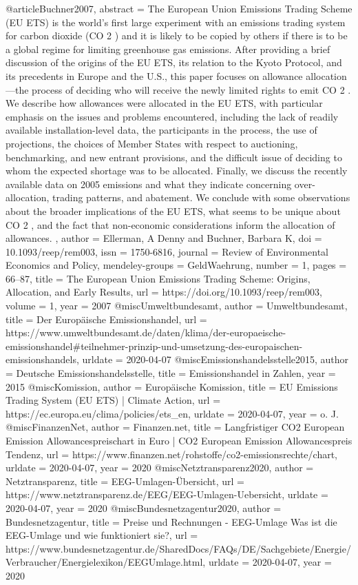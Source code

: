 @article{Buchner2007,
abstract = {The European Union Emissions Trading Scheme (EU ETS) is the world's first large experiment with an emissions trading system for carbon dioxide (CO 2 ) and it is likely to be copied by others if there is to be a global regime for limiting greenhouse gas emissions. After providing a brief discussion of the origins of the EU ETS, its relation to the Kyoto Protocol, and its precedents in Europe and the U.S., this paper focuses on allowance allocation—the process of deciding who will receive the newly limited rights to emit CO 2 . We describe how allowances were allocated in the EU ETS, with particular emphasis on the issues and problems encountered, including the lack of readily available installation-level data, the participants in the process, the use of projections, the choices of Member States with respect to auctioning, benchmarking, and new entrant provisions, and the difficult issue of deciding to whom the expected shortage was to be allocated. Finally, we discuss the recently available data on 2005 emissions and what they indicate concerning over-allocation, trading patterns, and abatement. We conclude with some observations about the broader implications of the EU ETS, what seems to be unique about CO 2 , and the fact that non-economic considerations inform the allocation of allowances. },
author = {Ellerman, A Denny and Buchner, Barbara K},
doi = {10.1093/reep/rem003},
issn = {1750-6816},
journal = {Review of Environmental Economics and Policy},
mendeley-groups = {GeldWaehrung},
number = {1},
pages = {66--87},
title = {{The European Union Emissions Trading Scheme: Origins, Allocation, and Early Results}},
url = {https://doi.org/10.1093/reep/rem003},
volume = {1},
year = {2007}
}
@misc{Umweltbundesamt,
author = {Umweltbundesamt},
title = {{Der Europ{\"{a}}ische Emissionshandel}},
url = {https://www.umweltbundesamt.de/daten/klima/der-europaeische-emissionshandel{\#}teilnehmer-prinzip-und-umsetzung-des-europaischen-emissionshandels},
urldate = {2020-04-07}
}
@misc{Emissionshandelsstelle2015,
author = {{Deutsche Emissionshandelsstelle}},
title = {{Emissionshandel in Zahlen}},
year = {2015}
}
@misc{Komission,
author = {{Europ{\"{a}}ische Komission}},
title = {{EU Emissions Trading System (EU ETS) | Climate Action}},
url = {https://ec.europa.eu/clima/policies/ets{\_}en},
urldate = {2020-04-07},
year = {{o. J.}}
}
@misc{FinanzenNet,
author = {Finanzen.net},
title = {{Langfristiger CO2 European Emission Allowancespreischart in Euro | CO2 European Emission Allowancespreis Tendenz}},
url = {https://www.finanzen.net/rohstoffe/co2-emissionsrechte/chart},
urldate = {2020-04-07},
year = {2020}
}
@misc{Netztransparenz2020,
author = {Netztransparenz},
title = {{EEG-Umlagen-{\"{U}}bersicht}},
url = {https://www.netztransparenz.de/EEG/EEG-Umlagen-Uebersicht},
urldate = {2020-04-07},
year = {2020}
}
@misc{Bundesnetzagentur2020,
author = {Bundesnetzagentur},
title = {{Preise und Rechnungen - EEG-Umlage Was ist die EEG-Umlage und wie funktioniert sie?}},
url = {https://www.bundesnetzagentur.de/SharedDocs/FAQs/DE/Sachgebiete/Energie/Verbraucher/Energielexikon/EEGUmlage.html},
urldate = {2020-04-07},
year = {2020}
}



